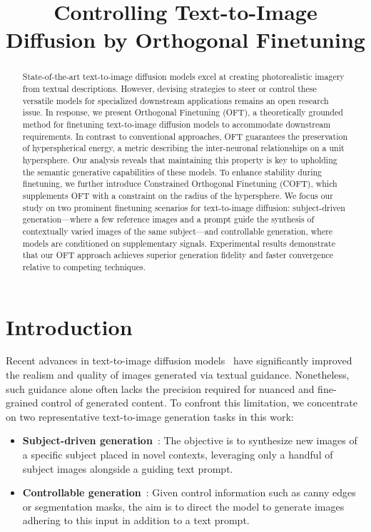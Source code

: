\title{Controlling Text-to-Image Diffusion by Orthogonal Finetuning}

\begin{abstract}
State-of-the-art text-to-image diffusion models excel at creating photorealistic imagery from textual descriptions. However, devising strategies to steer or control these versatile models for specialized downstream applications remains an open research issue. In response, we present Orthogonal Finetuning (OFT), a theoretically grounded method for finetuning text-to-image diffusion models to accommodate downstream requirements. In contrast to conventional approaches, OFT guarantees the preservation of hyperspherical energy, a metric describing the inter-neuronal relationships on a unit hypersphere. Our analysis reveals that maintaining this property is key to upholding the semantic generative capabilities of these models. To enhance stability during finetuning, we further introduce Constrained Orthogonal Finetuning (COFT), which supplements OFT with a constraint on the radius of the hypersphere. We focus our study on two prominent finetuning scenarios for text-to-image diffusion: subject-driven generation—where a few reference images and a prompt guide the synthesis of contextually varied images of the same subject—and controllable generation, where models are conditioned on supplementary signals. Experimental results demonstrate that our OFT approach achieves superior generation fidelity and faster convergence relative to competing techniques.
\end{abstract}

\section{Introduction}

Recent advances in text-to-image diffusion models~\cite{saharia2022photorealistic,ramesh2022hierarchical,rombach2022high} have significantly improved the realism and quality of images generated via textual guidance. Nonetheless, such guidance alone often lacks the precision required for nuanced and fine-grained control of generated content. To confront this limitation, we concentrate on two representative text-to-image generation tasks in this work:

\begin{itemize}[leftmargin=*,nosep]

    \item \textbf{Subject-driven generation}~\cite{ruiz2023dreambooth}: The objective is to synthesize new images of a specific subject placed in novel contexts, leveraging only a handful of subject images alongside a guiding text prompt.
    \item \textbf{Controllable generation}~\cite{zhang2023adding,mou2023t2i}: Given control information such as canny edges or segmentation masks, the aim is to direct the model to generate images adhering to this input in addition to a text prompt.
\end{itemize}

